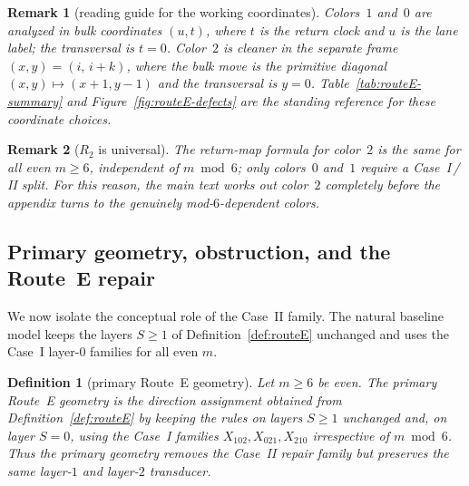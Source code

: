 \documentclass[11pt]{article}
\newtheorem{definition}{Definition}
\newtheorem{remark}{Remark}
\begin{document}
\begin{remark}[reading guide for the working coordinates]\label{rem:coord-guide}
Colors~$1$ and~$0$ are analyzed in bulk coordinates $(u,t)$, where $t$ is the return clock and $u$ is the lane label; the transversal is $t=0$.
Color~$2$ is cleaner in the separate frame $(x,y)=(i,\,i+k)$, where the bulk move is the primitive diagonal $(x,y)\mapsto(x+1,y-1)$ and the transversal is $y=0$.
Table~\ref{tab:routeE-summary} and Figure~\ref{fig:routeE-defects} are the standing reference for these coordinate choices.
\end{remark}

\begin{remark}[$R_2$ is universal]\label{rem:R2-universal}
The return-map formula for color~$2$ is the same for all even $m\ge 6$, independent of $m\bmod 6$; only colors~$0$ and~$1$ require a Case~I\,/\,II split.
For this reason, the main text works out color~$2$ completely before the appendix turns to the genuinely mod-$6$-dependent colors.
\end{remark}

\subsection{Primary geometry, obstruction, and the Route~E repair}\label{sec:primary-obstruction}

We now isolate the conceptual role of the Case~II family.
The natural baseline model keeps the layers $S\ge 1$ of Definition~\ref{def:routeE} unchanged and uses the Case~I layer-$0$ families for all even $m$.

\begin{definition}[primary Route~E geometry]\label{def:routeE-primary}
Let $m\ge 6$ be even.
The \emph{primary Route~E geometry} is the direction assignment obtained from Definition~\ref{def:routeE} by keeping the rules on layers $S\ge 1$ unchanged and, on layer $S=0$, using the Case~I families $X_{102},X_{021},X_{210}$ irrespective of $m\bmod 6$.
Thus the primary geometry removes the Case~II repair family but preserves the same layer-$1$ and layer-$2$ transducer.
\end{definition}
\end{document}
